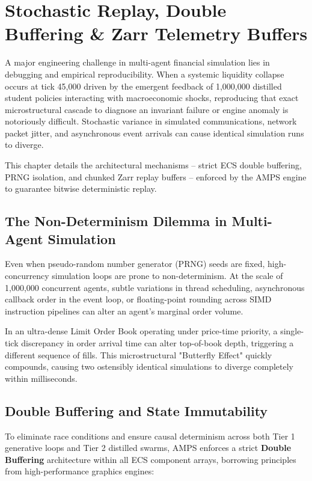 \chapter{Stochastic Replay, Double Buffering \& Zarr Telemetry Buffers}
\label{ch:stochastic_replay}

A major engineering challenge in multi-agent financial simulation lies in debugging and empirical reproducibility. When a systemic liquidity collapse occurs at tick 45,000 driven by the emergent feedback of 1,000,000 distilled student policies interacting with macroeconomic shocks, reproducing that exact microstructural cascade to diagnose an invariant failure or engine anomaly is notoriously difficult. Stochastic variance in simulated communications, network packet jitter, and asynchronous event arrivals can cause identical simulation runs to diverge. 

This chapter details the architectural mechanisms -- strict ECS double buffering, PRNG isolation, and chunked Zarr replay buffers -- enforced by the AMPS engine to guarantee bitwise deterministic replay.

\section{The Non-Determinism Dilemma in Multi-Agent Simulation}

Even when pseudo-random number generator (PRNG) seeds are fixed, high-concurrency simulation loops are prone to non-determinism. At the scale of 1,000,000 concurrent agents, subtle variations in thread scheduling, asynchronous callback order in the event loop, or floating-point rounding across SIMD instruction pipelines can alter an agent's marginal order volume.

In an ultra-dense Limit Order Book operating under price-time priority, a single-tick discrepancy in order arrival time can alter top-of-book depth, triggering a different sequence of fills. This microstructural "Butterfly Effect" quickly compounds, causing two ostensibly identical simulations to diverge completely within milliseconds. 

\section{Double Buffering and State Immutability}

To eliminate race conditions and ensure causal determinism across both Tier 1 generative loops and Tier 2 distilled swarms, AMPS enforces a strict \textbf{Double Buffering} architecture within all ECS component arrays, borrowing principles from high-performance graphics engines:

